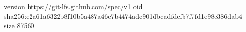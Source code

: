 version https://git-lfs.github.com/spec/v1
oid sha256:e2a61a6322b8f10b5a487a46c7b4474adc901dbcadfdcfb7f7fd1e98e386dab4
size 87560
